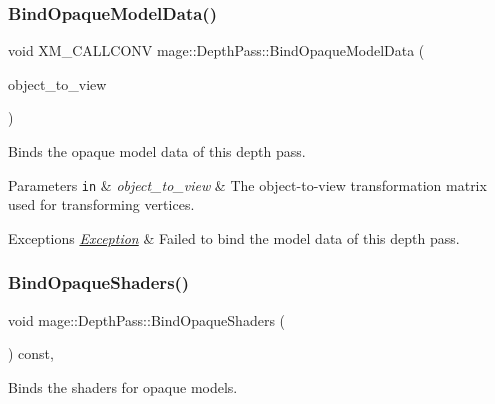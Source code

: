 \subsubsection{\texorpdfstring{Bind\+Opaque\+Model\+Data()}{BindOpaqueModelData()}}
{\footnotesize\ttfamily void X\+M\+\_\+\+C\+A\+L\+L\+C\+O\+NV mage\+::\+Depth\+Pass\+::\+Bind\+Opaque\+Model\+Data (\begin{DoxyParamCaption}\item[{F\+X\+M\+M\+A\+T\+R\+IX}]{object\+\_\+to\+\_\+view }\end{DoxyParamCaption})\hspace{0.3cm}{\ttfamily [private]}}

Binds the opaque model data of this depth pass.


\begin{DoxyParams}[1]{Parameters}
\mbox{\tt in}  & {\em object\+\_\+to\+\_\+view} & The object-\/to-\/view transformation matrix used for transforming vertices. \\
\hline
\end{DoxyParams}

\begin{DoxyExceptions}{Exceptions}
{\em \hyperlink{classmage_1_1_exception}{Exception}} & Failed to bind the model data of this depth pass. \\
\hline
\end{DoxyExceptions}
\hypertarget{classmage_1_1_depth_pass_a235d935a39ff21340ae6301d6b2ee326}{}\label{classmage_1_1_depth_pass_a235d935a39ff21340ae6301d6b2ee326} 
\subsubsection{\texorpdfstring{Bind\+Opaque\+Shaders()}{BindOpaqueShaders()}}
{\footnotesize\ttfamily void mage\+::\+Depth\+Pass\+::\+Bind\+Opaque\+Shaders (\begin{DoxyParamCaption}{ }\end{DoxyParamCaption}) const\hspace{0.3cm}{\ttfamily [private]}, {\ttfamily [noexcept]}}

Binds the shaders for opaque models. \hypertarget{classmage_1_1_depth_pass_a9fa93bf5d67b9396d358e595be55a075}{}\label{classmage_1_1_depth_pass_a9fa93bf5d67b9396d358e595be55a075} 
